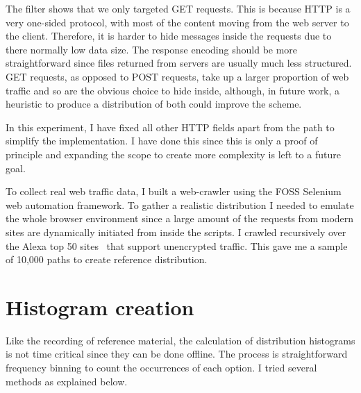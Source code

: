 \documentclass[ %
                    author={Samuel Russell},
                supervisor={Prof. Bogdan Warinschi},
                    degree={MEng},
                     title={Innocuous Ciphertexts},
                  subtitle={The DE-CENSOR Scheme},
                      type={research},
                      year={2018} ]{dissertation}
\begin{document}
The filter shows that we only targeted GET requests. This is because HTTP is a very one-sided protocol, with most of the content moving from the web server to the client.
Therefore, it is harder to hide messages inside the requests due to there normally low data size. The response encoding should be more straightforward since files returned from servers are usually much less structured. GET requests, as opposed to POST requests, take up a larger proportion of web traffic and so are the obvious choice to hide inside, although, in future work, a heuristic to produce a distribution of both could improve the scheme.

In this experiment, I have fixed all other HTTP fields apart from the path to simplify the implementation. I have done this since this is only a proof of principle and expanding the scope to create more complexity is left to a future goal.

To collect real web traffic data, I built a web-crawler using the FOSS Selenium web automation framework. To gather a realistic distribution I needed to emulate the whole browser environment since a large amount of the requests from modern sites are dynamically initiated from inside the scripts.
I crawled recursively over the Alexa top 50 sites~\cite{alexa} that support unencrypted traffic. This gave me a sample of 10,000 paths to create reference distribution.

\section{Histogram creation}

Like the recording of reference material, the calculation of distribution histograms is not time critical since they can be done offline. The process is straightforward frequency binning to count the occurrences of each option. I tried several methods as explained below.
\end{document}
